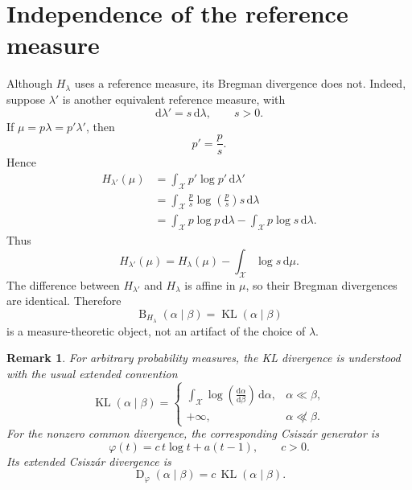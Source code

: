 \documentclass[11pt]{article}
\newtheorem{remark}{Remark}
\newcommand{\X}{\mathcal X}
\newcommand{\KL}{\operatorname{KL}}
\newcommand{\Breg}{\operatorname{B}}
\newcommand{\Dphi}{\operatorname{D}}
\newcommand{\dd}{\mathrm d}
\newcommand{\1}{\mathbf 1}
\begin{document}
\section{Independence of the reference measure}

Although \(H_\lambda\) uses a reference measure, its Bregman divergence does not.
Indeed, suppose \(\lambda'\) is another equivalent reference measure, with
\[
\dd\lambda'=s\,\dd\lambda,
\qquad
s>0.
\]
If \(\mu=p\lambda=p'\lambda'\), then
\[
p'=\frac{p}{s}.
\]
Hence
\begin{align*}
H_{\lambda'}(\mu)
&=
\int_\X p'\log p'\,\dd\lambda' \\
&=
\int_\X \frac{p}{s}\log\!\left(\frac{p}{s}\right)s\,\dd\lambda \\
&=
\int_\X p\log p\,\dd\lambda
-
\int_\X p\log s\,\dd\lambda.
\end{align*}
Thus
\[
H_{\lambda'}(\mu)
=
H_\lambda(\mu)
-
\int_\X \log s\,\dd\mu.
\]
The difference between \(H_{\lambda'}\) and \(H_\lambda\) is affine in \(\mu\),
so their Bregman divergences are identical. Therefore
\[
\Breg_{H_\lambda}(\alpha\mid\beta)
=
\KL(\alpha\mid\beta)
\]
is a measure-theoretic object, not an artifact of the choice of \(\lambda\).

\begin{remark}
For arbitrary probability measures, the KL divergence is understood with the usual
extended convention
\[
\KL(\alpha\mid\beta)
=
\begin{cases}
\displaystyle
\int_\X
\log\!\left(\frac{\dd\alpha}{\dd\beta}\right)
\,\dd\alpha,
& \alpha\ll\beta, \\[1.2em]
+\infty,
& \alpha\not\ll\beta.
\end{cases}
\]
For the nonzero common divergence, the corresponding Csisz\'ar generator is
\[
\varphi(t)=c\,t\log t+a(t-1),
\qquad c>0.
\]
Its extended Csisz\'ar divergence is
\[
\Dphi_\varphi(\alpha\mid\beta)
=
c\,\KL(\alpha\mid\beta).
\]
\end{remark}
\end{document}
